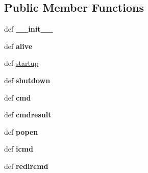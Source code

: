 \subsection*{Public Member Functions}
\begin{DoxyCompactItemize}
\item 
\hypertarget{classcore_1_1netns_1_1vnode_1_1_simple_lxc_node_af76e3e6010ace6ea450b93a938795ec9}{def {\bfseries \+\_\+\+\_\+init\+\_\+\+\_\+}}\label{classcore_1_1netns_1_1vnode_1_1_simple_lxc_node_af76e3e6010ace6ea450b93a938795ec9}

\item 
\hypertarget{classcore_1_1netns_1_1vnode_1_1_simple_lxc_node_ad4b41c71b00808672a27bed6b63c6e6b}{def {\bfseries alive}}\label{classcore_1_1netns_1_1vnode_1_1_simple_lxc_node_ad4b41c71b00808672a27bed6b63c6e6b}

\item 
def \hyperlink{classcore_1_1netns_1_1vnode_1_1_simple_lxc_node_a4fe8c2cedb52675868c835a55affd984}{startup}
\item 
\hypertarget{classcore_1_1netns_1_1vnode_1_1_simple_lxc_node_a6e1ac79d8f1172f912850d0faa9031e2}{def {\bfseries shutdown}}\label{classcore_1_1netns_1_1vnode_1_1_simple_lxc_node_a6e1ac79d8f1172f912850d0faa9031e2}

\item 
\hypertarget{classcore_1_1netns_1_1vnode_1_1_simple_lxc_node_a675cef5e2623c9df0aae10c7eb33837a}{def {\bfseries cmd}}\label{classcore_1_1netns_1_1vnode_1_1_simple_lxc_node_a675cef5e2623c9df0aae10c7eb33837a}

\item 
\hypertarget{classcore_1_1netns_1_1vnode_1_1_simple_lxc_node_a8c318a2f596528bda095f233e6431ac3}{def {\bfseries cmdresult}}\label{classcore_1_1netns_1_1vnode_1_1_simple_lxc_node_a8c318a2f596528bda095f233e6431ac3}

\item 
\hypertarget{classcore_1_1netns_1_1vnode_1_1_simple_lxc_node_a3d632ffe097915cdcfa3d68a1b1cde23}{def {\bfseries popen}}\label{classcore_1_1netns_1_1vnode_1_1_simple_lxc_node_a3d632ffe097915cdcfa3d68a1b1cde23}

\item 
\hypertarget{classcore_1_1netns_1_1vnode_1_1_simple_lxc_node_afb42723952e078355bb29813afa7564c}{def {\bfseries icmd}}\label{classcore_1_1netns_1_1vnode_1_1_simple_lxc_node_afb42723952e078355bb29813afa7564c}

\item 
\hypertarget{classcore_1_1netns_1_1vnode_1_1_simple_lxc_node_a731372611a46361ecff04ee241c5434b}{def {\bfseries redircmd}}\label{classcore_1_1netns_1_1vnode_1_1_simple_lxc_node_a731372611a46361ecff04ee241c5434b}


\end{DoxyCompactItemize}
